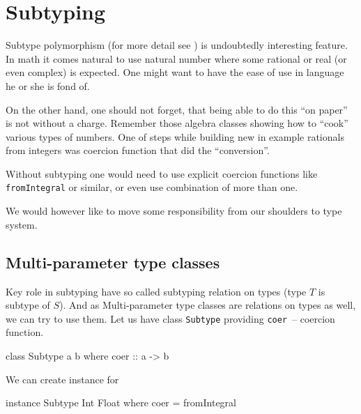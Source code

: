 \documentclass[11pt,oneside,draft]{fithesis2}
\newcommand\uv[1]{``#1''}
\theoremstyle{definition}
\begin{document}
%

\section{Subtyping}

Subtype polymorphism (for more detail see \cite{pierce:2002:types})
is undoubtedly interesting feature. In math it comes natural to use
natural number where some rational or real (or even complex) is expected.
%
One might want to have the ease of use in language
he or she is fond of.

On the other hand, one should not forget, that being
able to do this \uv{on paper} is not without a charge.
Remember those algebra classes showing how to \uv{cook}
various types of numbers. One of steps while building
new in example rationals from integers was
coercion function that did the \uv{conversion}.

Without subtyping one would need to use explicit
coercion functions like \texttt{fromIntegral} or
similar, or even use combination of more than one.

We would however like to move some responsibility
from our shoulders to type system.

\subsection{Multi-parameter type classes}

Key role in subtyping have so called subtyping relation
on types (type \(T\) is subtype of \(S\)).
And as Multi-parameter type classes are relations on types as well,
we can try to use them. Let us have class \texttt{Subtype} providing
\texttt{coer}~-- coercion function.

\begin{code}
class Subtype a b where
    coer :: a -> b
\end{code}

We can create instance for

\begin{code}
instance Subtype Int Float where
    coer = fromIntegral
\end{code}
\end{document}
